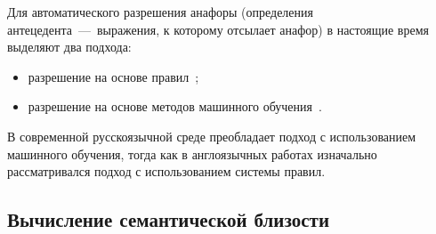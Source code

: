 Для автоматического разрешения анафоры (определения антецедента~---~выражения, к которому отсылает анафор) в настоящие время выделяют два подхода:
\begin{itemize}
	\item разрешение на основе правил~\cite{bogdanov2014anaphora, mitkovStateOfArt, carter1987interpreting, baldwin1997cogniac, azerkovich2019ispolzovanie,Ng2017MachineLF};
	\item разрешение на основе методов машинного обучения~\cite{inshakova2019razvitie, sokolov2017razrabotka, protopopova2014experience, eremeeva2018razreshenie, tolpegin2006algorithm, mitkovStateOfArt, Ng2017MachineLF}.
\end{itemize}

В современной русскоязычной среде преобладает подход с использованием машинного обучения, тогда как в англоязычных работах изначально рассматривался подход с использованием системы правил.

\subsection{Вычисление семантической близости}

